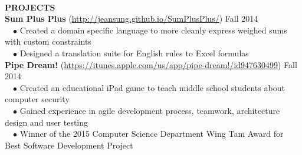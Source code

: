 \documentclass[11.5pt]{article}
\newcommand{\wrapTitle}[1]{{\sectionNL \textbf{\Large #1}} \sectionNL}
\newcommand{\sectionNL}{~\\[1pt]}
\newcommand{\customtab}{$\hspace{10pt} \bullet \hspace{2pt}$}
\newcommand{\JudgeNudge}{\hspace{4pt}}
\newcommand{\rightAlign}{\hfill}
\begin{document}
\begin{flushleft}
\wrapTitle{PROJECTS}
\textbf{Sum Plus Plus} (\url{http://jeansung.github.io/SumPlusPlus/}) \rightAlign Fall 2014 \\
\customtab Created a domain specific language to more cleanly express weighed sums with custom constraints \\
\customtab Designed a translation suite for English rules to Excel formulas \\

\textbf{Pipe Dream!} (\url{https://itunes.apple.com/us/app/pipe-dream!/id947630499})  \rightAlign Fall 2014 \\
\customtab Created an educational iPad game to teach middle school students about computer security\\
\customtab Gained experience in agile development process, teamwork, architecture design and user testing \\
\customtab Winner of the 2015 Computer Science Department Wing Tam Award for Best Software Development Project 



 


\end{flushleft}
\end{document}
